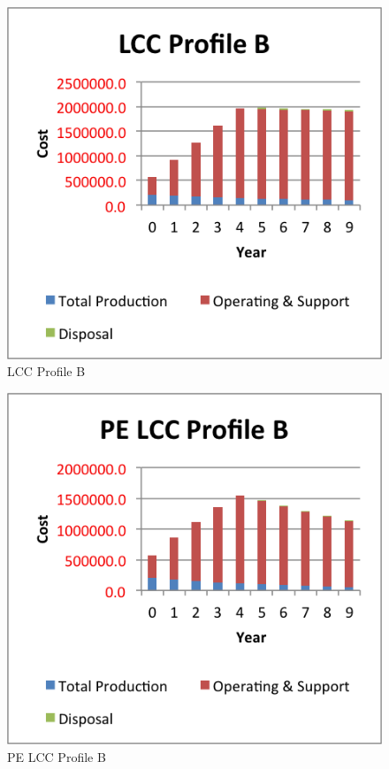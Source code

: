 \documentclass[letterpaper,10pt]{article}
\begin{document}
\begin{figure}[h!tbp]
	\begin{center}
		\includegraphics[scale=0.95]{images/LCCProfileB.png}
	\end{center}
	\caption{LCC Profile B}
	\label{fig:lccprofileb}
\end{figure}

\begin{figure}[h!tbp]
	\begin{center}
		\includegraphics[scale=0.95]{images/PELCCProfileB.png}
	\end{center}
	\caption{PE LCC Profile B}
	\label{fig:pelccprofileb}
\end{figure}
\end{document}
